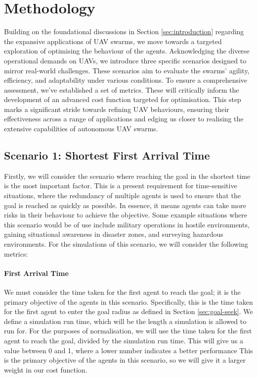 \documentclass[12pt]{article}
\begin{document}
\newpage
\section{Methodology}
\label{sec:methodology}

Building on the foundational discussions in Section \ref{sec:introduction} regarding the expansive applications of UAV swarms, we move towards a targeted exploration of optimising the behaviour of the agents. Acknowledging the diverse operational demands on UAVs, we introduce three specific scenarios designed to mirror real-world challenges. These scenarios aim to evaluate the swarms' agility, efficiency, and adaptability under various conditions. To ensure a comprehensive assessment, we've established a set of metrics. These will critically inform the development of an advanced cost function targeted for optimisation. This step marks a significant stride towards refining UAV behaviours, ensuring their effectiveness across a range of applications and edging us closer to realising the extensive capabilities of autonomous UAV swarms.

\subsection{Scenario 1: Shortest First Arrival Time}
Firstly, we will consider the scenario where reaching the goal in the shortest time is the most important factor. This is a present requirement for time-sensitive situations, where the redundancy of multiple agents is used to ensure that the goal is reached as quickly as possible. In essence, it means agents can take more risks in their behaviour to achieve the objective. Some example situations where this scenario would be of use include military operations in hostile environments, gaining situational awareness in disaster zones, and surveying hazardous environments\cite{Srinath}. For the simulations of this scenario, we will consider the following metrics:

\paragraph{First Arrival Time} 
We must consider the time taken for the first agent to reach the goal; it is the primary objective of the agents in this scenario. Specifically, this is the time taken for the first agent to enter the goal radius as defined in Section \ref{sec:goal-seek}. We define a simulation run time, which will be the length a simulation is allowed to run for. For the purposes of normalisation, we will use the time taken for the first agent to reach the goal, divided by the simulation run time. This will give us a value between 0 and 1, where a lower number indicates a better performance This is the primary objective of the agents in this scenario, so we will give it a larger weight in our cost function.
\end{document}

